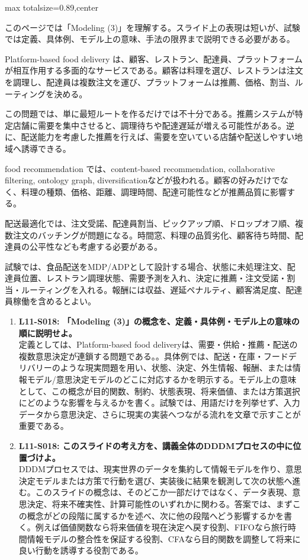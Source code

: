 \begin{minipage}[t]{0.58\textwidth}
\begin{adjustbox}{max totalsize={\textwidth}{0.89\textheight},center}
\begin{minipage}{\textwidth}\scriptsize
{}このページでは「Modeling (3)」を理解する。スライド上の表現は短いが、試験では定義、具体例、モデル上の意味、手法の限界まで説明できる必要がある。\par
Platform-based food delivery は、顧客、レストラン、配達員、プラットフォームが相互作用する多面的なサービスである。顧客は料理を選び、レストランは注文を調理し、配達員は複数注文を運び、プラットフォームは推薦、価格、割当、ルーティングを決める。\par
この問題では、単に最短ルートを作るだけでは不十分である。推薦システムが特定店舗に需要を集中させると、調理待ちや配達遅延が増える可能性がある。逆に、配送能力を考慮した推薦を行えば、需要を空いている店舗や配送しやすい地域へ誘導できる。\par
food recommendation では、content-based recommendation, collaborative filtering, ontology graph, diversificationなどが扱われる。顧客の好みだけでなく、料理の種類、価格、距離、調理時間、配達可能性などが推薦品質に影響する。\par
配送最適化では、注文受諾、配達員割当、ピックアップ順、ドロップオフ順、複数注文のバッチングが問題になる。時間窓、料理の品質劣化、顧客待ち時間、配達員の公平性なども考慮する必要がある。\par
試験では、食品配送をMDP/ADPとして設計する場合、状態に未処理注文、配達員位置、レストラン調理状態、需要予測を入れ、決定に推薦・注文受諾・割当・ルーティングを入れる。報酬には収益、遅延ペナルティ、顧客満足度、配達員稼働を含めるとよい。\par{}\begin{enumerate}\item \textbf{L11-S018: 「Modeling (3)」の概念を、定義・具体例・モデル上の意味の順に説明せよ。}\\定義としては、Platform-based food deliveryは、需要・供給・推薦・配送の複数意思決定が連鎖する問題である。。具体例では、配送・在庫・フードデリバリーのような現実問題を用い、状態、決定、外生情報、報酬、または情報モデル/意思決定モデルのどこに対応するかを明示する。モデル上の意味として、この概念が目的関数、制約、状態表現、将来価値、または方策選択にどのような影響を与えるかを書く。試験では、用語だけを列挙せず、入力データから意思決定、さらに現実の実装へつながる流れを文章で示すことが重要である。\item \textbf{L11-S018: このスライドの考え方を、講義全体のDDDMプロセスの中に位置づけよ。}\\DDDMプロセスでは、現実世界のデータを集約して情報モデルを作り、意思決定モデルまたは方策で行動を選び、実装後に結果を観測して次の状態へ進む。このスライドの概念は、そのどこか一部だけではなく、データ表現、意思決定、将来不確実性、計算可能性のいずれかに関わる。答案では、まずこの概念がどの段階に属するかを述べ、次に他の段階へどう影響するかを書く。例えば価値関数なら将来価値を現在決定へ戻す役割、FIFOなら旅行時間情報モデルの整合性を保証する役割、CFAなら目的関数を調整して将来に良い行動を誘導する役割である。\end{enumerate}

\end{minipage}
\end{adjustbox}
\end{minipage}
